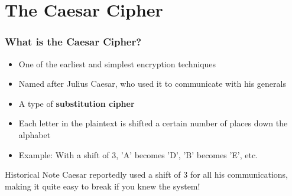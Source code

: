 \documentclass{beamer}
\begin{document}
\section{The Caesar Cipher}

\begin{frame}
    \frametitle{What is the Caesar Cipher?}
    \begin{itemize}
        \item One of the earliest and simplest encryption techniques
        \item Named after Julius Caesar, who used it to communicate with his generals
        \item A type of \textbf{substitution cipher}
        \item Each letter in the plaintext is shifted a certain number of places down the alphabet
        \item Example: With a shift of 3, 'A' becomes 'D', 'B' becomes 'E', etc.
    \end{itemize}
    
    \begin{alertblock}{Historical Note}
        Caesar reportedly used a shift of 3 for all his communications, making it quite easy to break if you knew the system!
    \end{alertblock}
\end{frame}
\end{document}
